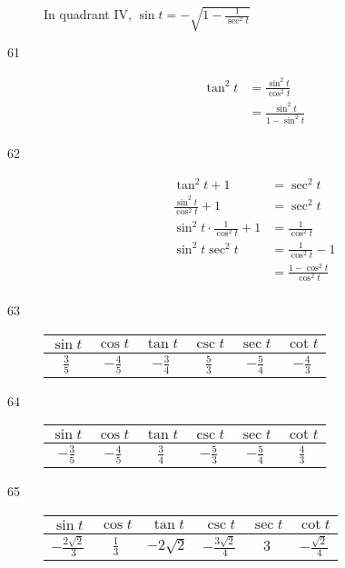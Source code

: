 \documentclass{exam}
\begin{document}
\begin{description}
        In quadrant IV, $\sin t = \boxed{ - \sqrt{ 1 - \frac{1}{\sec^2 t} } }$ 

      \item[61] 
        \begin{align*}
          \tan^2 t & = \frac{\sin^2 t}{\cos^2 t} \\
                   & = \boxed{ \frac{\sin^2 t}{1 - \sin^2 t} } \\
        \end{align*}

      \item[62] 
        \begin{align*}
          \tan^2 t + 1                          & = \sec^2 t \\
          \frac{\sin^2 t}{\cos^2 t} + 1         & = \sec^2 t \\
          \sin^2 t \cdot \frac{1}{\cos^2 t} + 1 & = \frac{1}{\cos^2 t} \\
          \sin^2 t \sec^2 t                     & = \frac{1}{\cos^2 t} - 1 \\
                                                & = \boxed{ \frac{1 - \cos^2 t}{\cos^2 t} } \\
        \end{align*}

      \item[63]
        \begin{tabular}[H]{cccccc}
          \toprule
          $\sin t$      & $\cos t$        & $\tan t$        & $\csc t$      & $\sec t$        & $\cot t$ \\
          \midrule
          $\frac{3}{5}$ & $- \frac{4}{5}$ & $- \frac{3}{4}$ & $\frac{5}{3}$ & $- \frac{5}{4}$ & $- \frac{4}{3}$ \\
          \bottomrule
        \end{tabular}

      \item[64]
        \begin{tabular}[H]{cccccc}
          \toprule
          $\sin t$        & $\cos t$        & $\tan t$      & $\csc t$        & $\sec t$        & $\cot t$ \\
          \midrule
          $- \frac{3}{5}$ & $- \frac{4}{5}$ & $\frac{3}{4}$ & $- \frac{5}{3}$ & $- \frac{5}{4}$ & $\frac{4}{3}$ \\
          \bottomrule
        \end{tabular}

      \item[65]
        \begin{tabular}[H]{cccccc}
          \toprule
          $\sin t$                 & $\cos t$      & $\tan t$       & $\csc t$                 & $\sec t$ & $\cot t$ \\
          \midrule
          $- \frac{2 \sqrt{2}}{3}$ & $\frac{1}{3}$ & $- 2 \sqrt{2}$ & $- \frac{3 \sqrt{2}}{4}$ & $3$      & $- \frac{\sqrt{2}}{4}$ \\
          \bottomrule
        \end{tabular}


\end{description}
\end{document}
